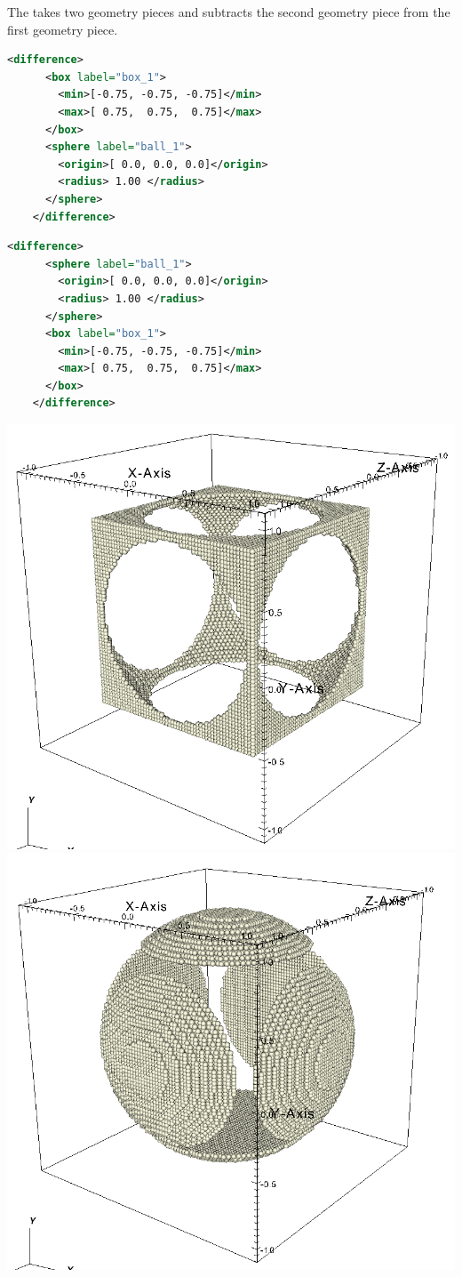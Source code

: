 \begin{minipage}{0.6\textwidth}
  The  takes two geometry pieces and subtracts
  the second geometry piece from the first geometry piece.  
  \begin{lstlisting}[language=XML]
    <difference>
      <box label="box_1">
        <min>[-0.75, -0.75, -0.75]</min>
        <max>[ 0.75,  0.75,  0.75]</max>
      </box>
      <sphere label="ball_1">
        <origin>[ 0.0, 0.0, 0.0]</origin>
        <radius> 1.00 </radius>
      </sphere>
    </difference>
  \end{lstlisting}
  \begin{lstlisting}[language=XML]
    <difference>
      <sphere label="ball_1">
        <origin>[ 0.0, 0.0, 0.0]</origin>
        <radius> 1.00 </radius>
      </sphere>
      <box label="box_1">
        <min>[-0.75, -0.75, -0.75]</min>
        <max>[ 0.75,  0.75,  0.75]</max>
      </box>
    </difference>
  \end{lstlisting}
\end{minipage}
\begin{minipage}{0.4\textwidth}
  \centering
  \includegraphics[width=0.7\columnwidth]{FIGS/geometry/geom_diff_12.png}
  \includegraphics[width=0.7\columnwidth]{FIGS/geometry/geom_diff_21.png}
\end{minipage}

